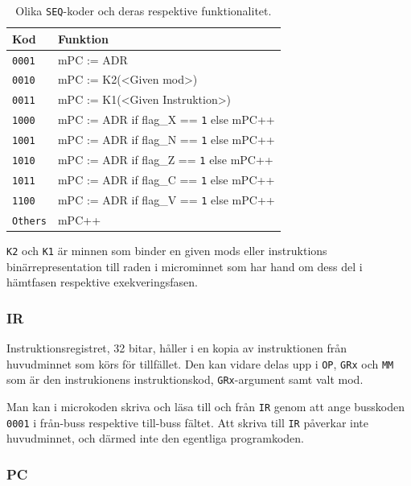\documentclass[]{article}
\begin{document}
\begin{table}[H]
\centering
\begin{tabular}{ll}
	\textbf{Kod}    & \textbf{Funktion}                              \\ \hline
	\texttt{0001}   & mPC := ADR                                     \\
	\texttt{0010}   & mPC := K2(<Given mod>)                         \\
	\texttt{0011}   & mPC := K1(<Given Instruktion>)                 \\
	\texttt{1000}   & mPC := ADR if flag\_X == \texttt{1} else mPC++ \\
	\texttt{1001}   & mPC := ADR if flag\_N == \texttt{1} else mPC++ \\
	\texttt{1010}   & mPC := ADR if flag\_Z == \texttt{1} else mPC++ \\
	\texttt{1011}   & mPC := ADR if flag\_C == \texttt{1} else mPC++ \\
	\texttt{1100}   & mPC := ADR if flag\_V == \texttt{1} else mPC++ \\
	\texttt{Others} & mPC++
\end{tabular}
\caption{Olika \texttt{SEQ}-koder och deras respektive funktionalitet.}
\end{table}

\noindent
\texttt{K2} och \texttt{K1} är minnen som binder en given mods eller instruktions binärrepresentation till raden i microminnet som har hand om dess del i hämtfasen respektive exekveringsfasen.

\subsubsection{IR}

Instruktionsregistret, 32 bitar, håller i en kopia av instruktionen från huvudminnet som körs för tillfället. Den kan vidare delas upp i \texttt{OP}, \texttt{GRx} och \texttt{MM} som är den instrukionens instruktionskod, \texttt{GRx}-argument samt valt mod.

Man kan i microkoden skriva och läsa till och från \texttt{IR} genom att ange busskoden \texttt{0001} i från-buss respektive till-buss fältet. Att skriva till \texttt{IR} påverkar inte huvudminnet, och därmed inte den egentliga programkoden.

\subsubsection{PC}
\end{document}
